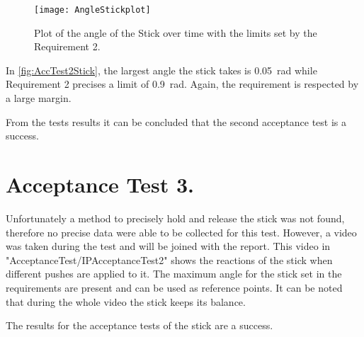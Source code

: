 \begin{figure} [htbp]
	\centering
	\texttt{[image: AngleStickplot]}
	\caption{Plot of the angle of the Stick over time with the limits set by the Requirement 2.}
	\label{fig:AccTest2Stick}
\end{figure}

In \autoref{fig:AccTest2Stick}, the largest angle the stick takes is \SI{0.05}{\radian} while Requirement 2 precises a limit of \SI{0.9}{\radian}. Again, the requirement is respected by a large margin.

From the tests results it can be concluded that the second acceptance test is a success.

\section{Acceptance Test 3.}

Unfortunately a method to precisely hold and release the stick was not found, therefore no precise data were able to be collected for this test. However, a video was taken during the test and will be joined with the report. This video in "AcceptanceTest/IPAcceptanceTest2" shows the reactions of the stick when different pushes are applied to it. The maximum angle for the stick set in the requirements are present and can be used as reference points. It can be noted that during the whole video the stick keeps its balance.

The results for the acceptance tests of the stick are a success.
